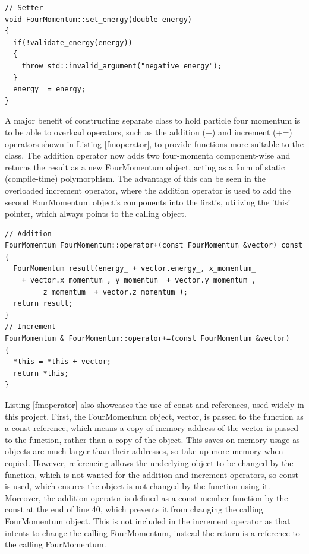 \documentclass[11pt]{article} %
\begin{document}
\begin{lstlisting}[firstnumber=30, caption={Showing setter for energy private data member in FourMomentum.cpp.}, label=ssss]
// Setter
void FourMomentum::set_energy(double energy)
{
  if(!validate_energy(energy))
  {
    throw std::invalid_argument("negative energy");
  }
  energy_ = energy;
}
\end{lstlisting} 

A major benefit of constructing separate class to hold particle four momentum is to be able to overload operators, such as the addition (+) and increment (+=) operators shown in Listing \ref{fmoperator}, to provide functions more suitable to the class. The addition operator now adds two four-momenta component-wise and returns the result as a new FourMomentum object, acting as a form of static (compile-time) polymorphism. The advantage of this can be seen in the overloaded increment operator, where the addition operator is used to add the second FourMomentum object's components into the first's, utilizing the 'this' pointer, which always points to the calling object. 

\begin{lstlisting}[firstnumber=39, caption={Code snippet from FourMomentum.cpp showing the overloading of + and += operators to add FourMomentum objects component-wise.}, label=fmoperator]
// Addition
FourMomentum FourMomentum::operator+(const FourMomentum &vector) const
{
  FourMomentum result(energy_ + vector.energy_, x_momentum_ 
    + vector.x_momentum_, y_momentum_ + vector.y_momentum_,
		 z_momentum_ + vector.z_momentum_);
  return result;
}
// Increment
FourMomentum & FourMomentum::operator+=(const FourMomentum &vector)
{
  *this = *this + vector;
  return *this;
}
\end{lstlisting} 

Listing \ref{fmoperator} also showcases the use of const and references, used widely in this project. First, the FourMomentum object, vector, is passed to the function as a const reference, which means a copy of memory address of the vector is passed to the function, rather than a copy of the object. This saves on memory usage as objects are much larger than their addresses, so take up more memory when copied. However, referencing allows the underlying object to be changed by the function, which is not wanted for the addition and increment operators, so const is used, which ensures the object is not changed by the function using it. Moreover, the addition operator is defined as a const member function by the const at the end of line 40, which prevents it from changing the calling FourMomentum object. This is not included in the increment operator as that intents to change the calling FourMomentum, instead the return is a reference to the calling FourMomentum. 
\end{document}
